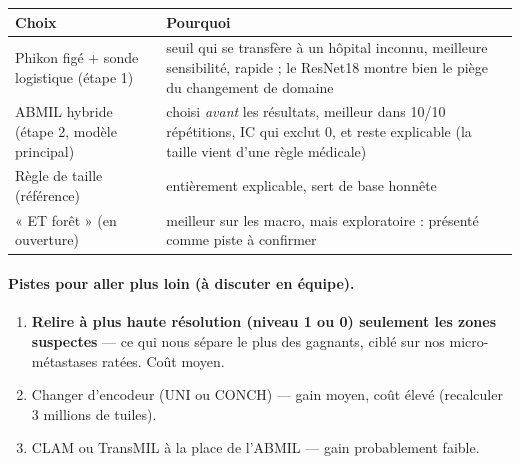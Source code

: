 \documentclass[11pt,a4paper]{article}
\begin{document}
\begin{table}[H]
\centering
\begin{tabularx}{\textwidth}{lX}
\toprule
\textbf{Choix} & \textbf{Pourquoi} \\
\midrule
Phikon figé + sonde logistique (étape 1) & seuil qui se transfère à un hôpital inconnu, meilleure sensibilité, rapide ;
  le ResNet18 montre bien le piège du changement de domaine \\
ABMIL hybride (étape 2, modèle principal) & choisi \emph{avant} les résultats, meilleur dans 10/10 répétitions, IC qui exclut 0,
  et reste explicable (la taille vient d'une règle médicale) \\
Règle de taille (référence) & entièrement explicable, sert de base honnête \\
« ET forêt » (en ouverture) & meilleur sur les macro, mais exploratoire : présenté comme piste à confirmer \\
\bottomrule
\end{tabularx}
\end{table}

\paragraph{Pistes pour aller plus loin (à discuter en équipe).}
\begin{enumerate}
  \item \textbf{Relire à plus haute résolution (niveau 1 ou 0) seulement les zones suspectes} — ce qui nous sépare le plus des gagnants,
        ciblé sur nos micro-métastases ratées. Coût moyen.
  \item Changer d'encodeur (UNI ou CONCH) — gain moyen, coût élevé (recalculer 3 millions de tuiles).
  \item CLAM ou TransMIL à la place de l'ABMIL — gain probablement faible.
\end{enumerate}

\end{document}
